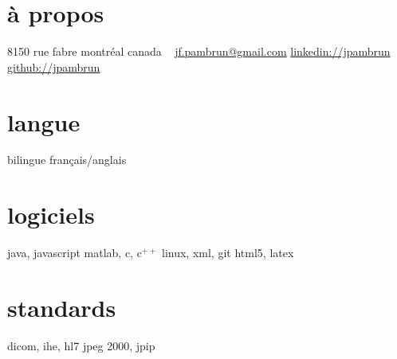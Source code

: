 \documentclass[]{friggeri-cv}
\newif\ifenglish
\begin{document}
\ifenglish
\header{jean-françois}{pambrun}{researcher | engineer | software developer}
\else
{}
\fi


\begin{aside}
    \ifenglish\section{about}\else\section{à propos}\fi
    {\small8150} rue fabre
    montréal
    canada
    ~
    \href{mailto:jf.pambrun@gmail.com}{jf.pambrun@gmail.com}
    \href{https://ca.linkedin.com/in/jpambrun}{linkedin://jpambrun}
    \href{http://github.com/jpambrun}{github://jpambrun}
    \ifenglish\section{languages}\else\section{langue}\fi
    \ifenglish bilingual french/english \else bilingue français/anglais \fi
    \ifenglish\section{programming}\else\section{logiciels}\fi
    java, javascript
    matlab, c, c{\tiny$^{++}$}
    linux, xml, git
    html{\small5}, latex
    \ifenglish\section{standards}\else\section{standards}\fi
    dicom, ihe, hl{\small7}
    jpeg {\small2000}, jpip
\end{aside}

\end{document}
